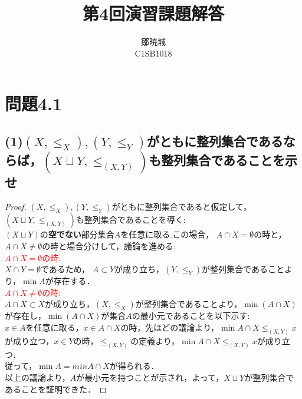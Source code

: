 \documentclass{jreport}
\begin{document}
\title{第4回演習課題解答}
\author{鄒暁城\\ C1SB1018}
\maketitle
\setcounter{chapter}{4}
\newpage
\tableofcontents
{}
\newpage
\section{問題4.1}
\subsection{\normalsize{(1)$(X,\le_{X}),(Y,\le_{Y})$がともに整列集合であるならば，$(X\sqcup Y, \le_{(X,Y)})$も整列集合であることを示せ}}
\begin{proof}
  $(X,\le_{X}),(Y,\le_{Y})$がともに整列集合であると仮定して，{$(X\sqcup Y, \le_{(X,Y)})$}も整列集合であることを導く:\\
  $(X\sqcup Y)$の\textbf{空でない}部分集合$A$を任意に取る.この場合，
  $A\cap X = \emptyset$の時と，
  $A\cap X \ne \emptyset$の時と場合分けして，議論を進める:\\
  \textcolor{red}{$A\cap X = \emptyset$の時:\\}
  $X\cap Y = \emptyset$であるため， $A \subset Y$が成り立ち，$(Y,\le_{Y})$が整列集合であることより，$\min A$が存在する．\\
  \textcolor{red}{$A\cap X \ne \emptyset$の時:\\}
	$A\cap X \subset X$が成り立ち，$(X,\le_{X})$が整列集合であることより，$\min (A\cap X) $が存在し，$\min (A\cap X) $が集合$A$の最小元であることを以下示す:\\
  $x \in A$を任意に取る，$x \in A\cap X$の時，先ほどの議論より，$\min A\cap X \le_{(X,Y)} x$が成り立つ，$x \in Y$の時，$\le_{(X,Y)}$の定義より，$\min A\cap X \le_{(X,Y)} x $が成り立つ．\\
  従って，$\min A = min A\cap X$が得られる．\\
  以上の議論より，$A$が最小元を持つことが示され，よって，$X \sqcup Y$が整列集合であることを証明できた．
\end{proof}
\newpage
\end{document}
